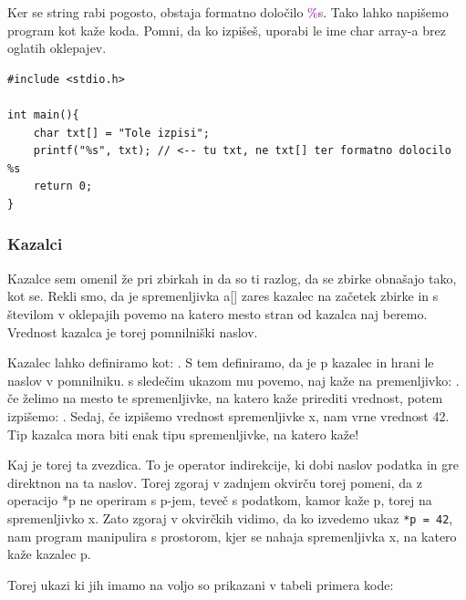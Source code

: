\documentclass[a4paper, 12pt]{article}
\begin{document}
Ker se string rabi pogosto, obstaja formatno določilo \textcolor{purple}{\%s}. Tako lahko napišemo program kot kaže koda. Pomni, da ko izpišeš, uporabi le ime char array-a brez oglatih oklepajev.

\begin{lstlisting}[caption = Znakovni niz: navajanje 2]
#include <stdio.h>

int main(){
	char txt[] = "Tole izpisi";
	printf("%s", txt); // <-- tu txt, ne txt[] ter formatno dolocilo %s
	return 0;
}
\end{lstlisting}

\subsubsection{Kazalci}

Kazalce sem omenil že pri zbirkah in da so ti razlog, da se zbirke obnašajo tako, kot se. Rekli smo, da je spremenljivka a[] zares kazalec na začetek zbirke in s številom v oklepajih povemo na katero mesto stran od kazalca naj beremo. Vrednost kazalca je torej pomnilniški naslov.\

Kazalec lahko definiramo kot: . S tem definiramo, da je p kazalec in hrani le naslov v pomnilniku. s sledečim ukazom mu povemo, naj kaže na premenljivko:  . če želimo na mesto te spremenljivke, na katero kaže prirediti vrednost, potem izpišemo: . Sedaj, če izpišemo vrednost spremenljivke x, nam vrne vrednost 42. Tip kazalca mora biti enak tipu spremenljivke, na katero kaže!\

Kaj je torej ta zvezdica. To je operator indirekcije, ki dobi naslov podatka in gre direktnon na ta naslov. Torej zgoraj v zadnjem okvirču torej pomeni, da z operacijo *p ne operiram s p-jem, teveč s podatkom, kamor kaže p, torej na spremenljivko x. Zato zgoraj v okvirčkih vidimo, da ko izvedemo ukaz \lstinline|*p = 42|, nam program manipulira s prostorom, kjer se nahaja spremenljivka x, na katero kaže kazalec p.

Torej ukazi ki jih imamo na voljo so prikazani v tabeli primera kode:
\end{document}
